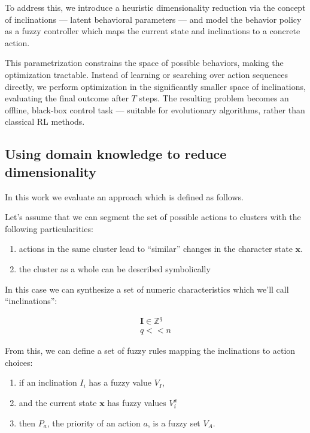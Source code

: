 \documentclass[12pt, a4paper]{article}
\begin{document}
To address this, we introduce a heuristic dimensionality reduction via the concept of inclinations — latent behavioral parameters — and model the behavior policy as a fuzzy controller which maps the current state and inclinations to a concrete action.

This parametrization constrains the space of possible behaviors, making the optimization tractable. Instead of learning or searching over action sequences directly, we perform optimization in the significantly smaller space of inclinations, evaluating the final outcome after $T$ steps. The resulting problem becomes an offline, black-box control task — suitable for evolutionary algorithms, rather than classical RL methods.

	\subsection{Using domain knowledge to reduce dimensionality}

	In this work we evaluate an approach which is defined as follows.
	
	Let's assume that we can segment the set of possible actions to clusters with the following particularities:
	
	\begin{enumerate}
		\item actions in the same cluster lead to ``similar'' changes in the character state $\mathbf{x}$.
		\item the cluster as a whole can be described symbolically
	\end{enumerate}
	
	In this case we can synthesize a set of numeric characteristics which we'll call ``inclinations'':
	
	\begin{eqnarray}
		\mathbf{I} \in \mathbb{Z}^q\\
		q << n \label{q<<n}
	\end{eqnarray}

	From this, we can define a set of fuzzy rules\cite{ray2014softcomputing} mapping the inclinations to action choices:

	\begin{enumerate}
		\item if an inclination $I_i$ has a fuzzy value $V_I$,
		\item and the current state $\mathbf{x}$ has fuzzy values $V^x_i$
		\item then $P_a$, the priority of an action $a$, is a fuzzy set $V_A$.
	\end{enumerate}
	
\end{document}
